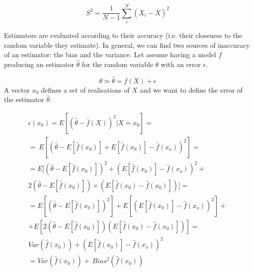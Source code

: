 \begin{equation}
S^2=\frac{1}{N-1}{\sum_{i}^{N}\left(X_i-\bar{X}\right)^2}
\label{eq_sampleVariance}
\end{equation}

Estimators are evaluated according to their accuracy (i.e. their closeness to the random variable they estimate). In general, we can find two sources of inaccuracy of an estimator: the bias and the variance. Let assume having a model $f$ producing an estimator $\hat{\theta}$ for the random variable $\theta$ with an error $\epsilon$. 

\begin{equation}
\theta \simeq \hat{\theta}=f\left(X\right)+\epsilon
\label{eq_bias1}
\end{equation}
A vector $x_0$ defines a set of realisations of $X$ and we want to define the error of the estimator $\hat{\theta}$.

\begin{equation}
    \label{eq_bias2}
    \begin{split}
    \epsilon\left(x_0\right) = E\left[\left(\hat{\theta}-\hat{f}\left(X\right)\right)^2|X=x_0\right]= \\
     =\ E\left[\left(\hat{\theta}-E\left[\hat{f}\left(x_0\right)\right]+E\left[\hat{f}\left(x_0\right)\right]-\hat{f}\left(x_o\right)\right)^2\right]=\\
     = E[\left(\hat{\theta}-E\left[\hat{f}\left(x_0\right)\right]\right)^2 + \left(E\left[\hat{f}\left(x_0\right)\right]-\hat{f}\left(x_o\right)\right)^2 + \\ 2\left(\hat{\theta}-E\left[\hat{f}\left(x_0\right)\right]\right)\times \left(E\left[\hat{f}\left(x_0\right)-\hat{f}(x_0)\right]\right)]=\\
     =E\left[\left(\hat{\theta}-E\left[\hat{f}\left(x_0\right)\right]\right)^2\right] +E\left[\left(E\left[\hat{f}\left(x_0\right)\right]-\hat{f}\left(x_o\right)\right)^2\right] + \\
     + E\left[2\left(\hat{\theta}-E\left[\hat{f}\left(x_0\right)\right]\right)\left(E\left[\hat{f}\left(x_0\right)-\hat{f}\left(x_0\right)\right]\right)\right]=\\
     Var\left(\hat{f}\left(x_0\right)\right)+\left(E\left[\hat{f}\left(x_0\right)\right]-\hat{f}\left(x_o\right)\right)^2\\
     =Var\left(\hat{f}\left(x_0\right)\right)+\ Bias^2\left(\hat{f}\left(x_0\right)\right)\\
    \end{split}
\end{equation}


